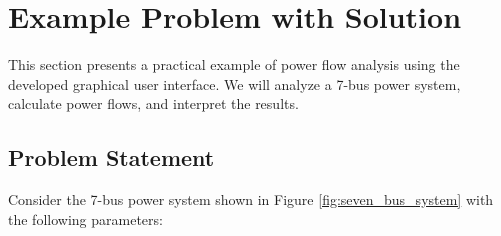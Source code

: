 \documentclass{article}
\begin{document}
	\section{Example Problem with Solution}
	
	This section presents a practical example of power flow analysis using the developed graphical user interface. We will analyze a 7-bus power system, calculate power flows, and interpret the results.
	
	\subsection{Problem Statement}
	
	Consider the 7-bus power system shown in Figure \ref{fig:seven_bus_system} with the following parameters:
	
\end{document}
